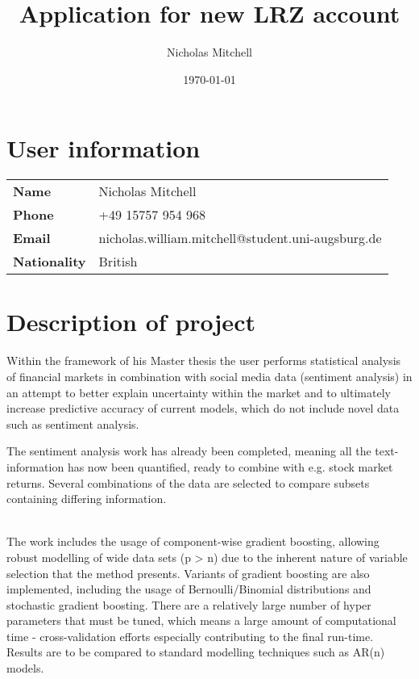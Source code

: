 \documentclass{article}
\author{Nicholas Mitchell}
\date{\today}
\title{Application for new LRZ account}
\begin{document}
\maketitle
\tableofcontents

\pagebreak

\section{User information}
\label{sec-1}

\begin{center}
\begin{tabular}{l|l}
\textbf{Name} & Nicholas Mitchell\\
\textbf{Phone} & +49 15757 954 968\\
\textbf{Email} & nicholas.william.mitchell@student.uni-augsburg.de\\
\textbf{Nationality} & British\\
\end{tabular}
\end{center}

\section{Description of project}
\label{sec-2}

Within the framework of his Master thesis the user performs statistical analysis of financial markets in combination with social media data (sentiment analysis) in an attempt to better explain uncertainty within the market and to ultimately increase predictive accuracy of current models, which do not include novel data such as sentiment analysis.\newline

\noindent
The sentiment analysis work has already been completed, meaning all the text-information has now been quantified, ready to combine with e.g. stock market returns. Several combinations of the data are selected to compare subsets containing differing information.\\\

\noindent
The work includes the usage of component-wise gradient boosting, allowing robust modelling of wide data sets (p > n) due to the inherent nature of variable selection that the method presents. Variants of gradient boosting are also implemented, including the usage of Bernoulli/Binomial distributions and stochastic gradient boosting. There are a relatively large number of hyper parameters that must be tuned, which means a large amount of computational time - cross-validation efforts especially contributing to the final run-time. Results are to be compared to standard modelling techniques such as AR(n) models.
\end{document}
